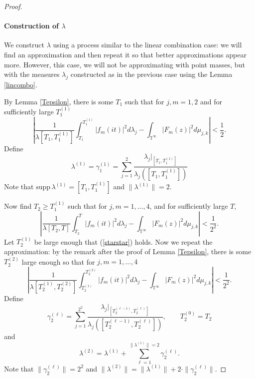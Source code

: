 \documentclass[]{elsarticle}
\newcommand{\T}{\mathbb{T}}
\numberwithin{equation}{section}
\begin{document}
\begin{proof}
      \paragraph{Construction of $\lambda$} We construct $\lambda$ using a process similar to the linear combination case: we will find an approximation and then repeat it so that better approximations appear more. However, this case, we will not be approximating with point masses, but with the measures $\lambda_j$ constructed as in the previous case using the Lemma \ref{lincombo}. 

      By Lemma \ref{Tepsilon}, there is some $T_1$ such that for $j,m =1,2$ and for sufficiently large $T_1^{(1)}$
      \begin{equation}\label{star1}
        \left|\frac{1}{\lambda[T_1,T_1^{(1)}]}\int_{T_1}^{T_1^{(1)}}|f_m(it)|^2d\lambda_j - \int_{\T^{\infty}}|F_m(z)|^2d\mu_{j,k}\right|<\frac{1}{2}.
      \end{equation}
      Define
      $$\lambda^{(1)}=\gamma_1^{(1)} = \sum_{j=1}^{2}\frac{\lambda_j|_{[T_1, T_1^{(1)}]}}{\lambda_j([T_1, T_1^{(1)}])} $$
      Note that $\text{supp}\, \lambda^{(1)} = [T_1, T_1^{(1)}]$ and $\|\lambda^{(1)}\|=2.$ 

      Now find $T_2\geq T_1^{(1)}$ such that for $j,m=1, \dots, 4$, and for sufficiently large $T$,
      \begin{equation}\label{starstar}
        \left|\frac{1}{\lambda[T_2,T]}\int_{T_2}^{T}|f_m(it)|^2d\lambda_j - \int_{\T^{\infty}}|F_m(z)|^2d\mu_{j,k}\right|<\frac{1}{2^2}.
      \end{equation}
      Let $T_2^{(1)}$ be large enough that (\ref{starstar}) holds. Now we repeat the approximation: by the remark after the proof of Lemma \ref{Tepsilon}, there is some $T_2^{(2)}$ large enough so that for $j,m = 1,\dots, 4$
      \begin{equation*}
        \left|\frac{1}{\lambda[T_2^{(1)},T_2^{(2)}]}\int_{T_2^{(1)}}^{T_2^{(2)}}|f_m(it)|^2d\lambda_j - \int_{\T^{\infty}}|F_m(z)|^2d\mu_{j,k}\right|<\frac{1}{2^2}.
      \end{equation*}
      Define 
      \begin{equation*}
        \gamma_2^{(\ell)} = \sum_{j=1}^{2^2}\frac{\lambda_j|_{[T_2^{(\ell-1)},T_2^{(\ell)}]}}{\lambda_j([T_2^{(\ell-1)},T_2^{(\ell)}])},\qquad T_2^{(0)} = T_2
      \end{equation*}
      and 
        $$\lambda^{(2)}= \lambda^{(1)}+ \sum_{\ell =1}^{\|\lambda^{(1)}\|=2}\gamma_2^{(\ell)}.$$ 
      Note that $\|\gamma_2^{(\ell)}\|=2^2$ and $\|\lambda^{(2)}\| = \|\lambda^{(1)}\|+2\cdot \|\gamma_2^{(\ell)}\| $. 


\end{proof}
\end{document}
